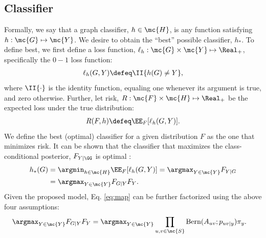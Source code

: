 \documentclass[10pt,journal,cspaper,compsoc]{IEEEtran}
\begin{document}

\subsection{Classifier} %
\label{sub:classifier}



Formally, we say that a graph classifier, $h \in \mc{H}$, is any function satisfying $h: \mc{G} \mapsto \mc{Y}$.  We desire to obtain the ``best'' possible classifier, $h_*$. To define best, we first define a loss function, $\ell_h: \mc{G} \times \mc{Y} \mapsto \Real_+$, specifically the $0-1$ loss function:
\begin{align}
\ell_h(G,Y) \defeq \II \{h(G) \neq Y\}, %
\end{align}
where $\II\{\cdot\}$ is the identity function, equaling one whenever its argument is true, and zero otherwise.  Further, let risk, $R: \mc{F} \times \mc{H} \mapsto \Real_+$ be the expected loss under the true distribution:
\begin{align}
R(F,h) \defeq \EE_F[\ell_h(G,Y)].
\end{align}
We define the best (optimal) classifier for a given distribution $F$ as the one that minimizes risk.
It can be shown that the classifier that maximizes the class-conditional posterior, $F_{Y | \GG}$ is optimal \cite{Bickel2000}:
\begin{align} \label{eq:map}
h_*(G) &= \argmin_{h \in \mc{H}} \EE_F[\ell_h (G,Y)] = \argmax_{Y \in \mc{Y}} F_{Y|G} 
\nonumber \\ &= \argmax_{Y \in \mc{Y}} F_{G|Y} F_Y.
\end{align}
Given the proposed model, Eq. \eqref{eq:map} can be further factorized using the above four assumptions:
\begin{align}
\argmax_{Y \in \mc{Y}} F_{G|Y} F_Y 
&= \argmax_{Y \in \mc{Y}} \prod_{u,v \in \mc{S}} \text{Bern}(A_{uv}; p_{uv|y}) \pi_y.
\end{align}
\end{document}
